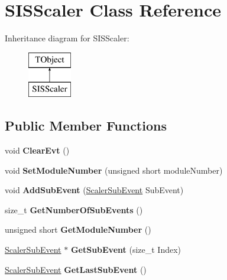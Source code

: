 \hypertarget{class_s_i_s_scaler}{\section{S\-I\-S\-Scaler Class Reference}
\label{class_s_i_s_scaler}
}
Inheritance diagram for S\-I\-S\-Scaler\-:\begin{figure}[H]
\begin{center}
\leavevmode
\includegraphics[height=2.000000cm]{class_s_i_s_scaler}
\end{center}
\end{figure}
\subsection*{Public Member Functions}
\begin{DoxyCompactItemize}
\item 
\hypertarget{class_s_i_s_scaler_a1038e9479e85008d7283bb10d3a0ea52}{void {\bfseries Clear\-Evt} ()}\label{class_s_i_s_scaler_a1038e9479e85008d7283bb10d3a0ea52}

\item 
\hypertarget{class_s_i_s_scaler_a19a3c1b9b24d6dd3f359c25749cca97b}{void {\bfseries Set\-Module\-Number} (unsigned short module\-Number)}\label{class_s_i_s_scaler_a19a3c1b9b24d6dd3f359c25749cca97b}

\item 
\hypertarget{class_s_i_s_scaler_acd7452d99f825be03e150ca7095e81f2}{void {\bfseries Add\-Sub\-Event} (\hyperlink{class_scaler_sub_event}{Scaler\-Sub\-Event} Sub\-Event)}\label{class_s_i_s_scaler_acd7452d99f825be03e150ca7095e81f2}

\item 
\hypertarget{class_s_i_s_scaler_aa0fc0b485191e72ef46ed4fccb9525e1}{size\-\_\-t {\bfseries Get\-Number\-Of\-Sub\-Events} ()}\label{class_s_i_s_scaler_aa0fc0b485191e72ef46ed4fccb9525e1}

\item 
\hypertarget{class_s_i_s_scaler_aa3c573faebe1e226c94834515f94cfe4}{unsigned short {\bfseries Get\-Module\-Number} ()}\label{class_s_i_s_scaler_aa3c573faebe1e226c94834515f94cfe4}

\item 
\hypertarget{class_s_i_s_scaler_a8596170dd427752af3c9e2343971e07c}{\hyperlink{class_scaler_sub_event}{Scaler\-Sub\-Event} $\ast$ {\bfseries Get\-Sub\-Event} (size\-\_\-t Index)}\label{class_s_i_s_scaler_a8596170dd427752af3c9e2343971e07c}

\item 
\hypertarget{class_s_i_s_scaler_a2fc33da7a9676cc15912ead53f72ff06}{\hyperlink{class_scaler_sub_event}{Scaler\-Sub\-Event} {\bfseries Get\-Last\-Sub\-Event} ()}\label{class_s_i_s_scaler_a2fc33da7a9676cc15912ead53f72ff06}

\end{DoxyCompactItemize}
